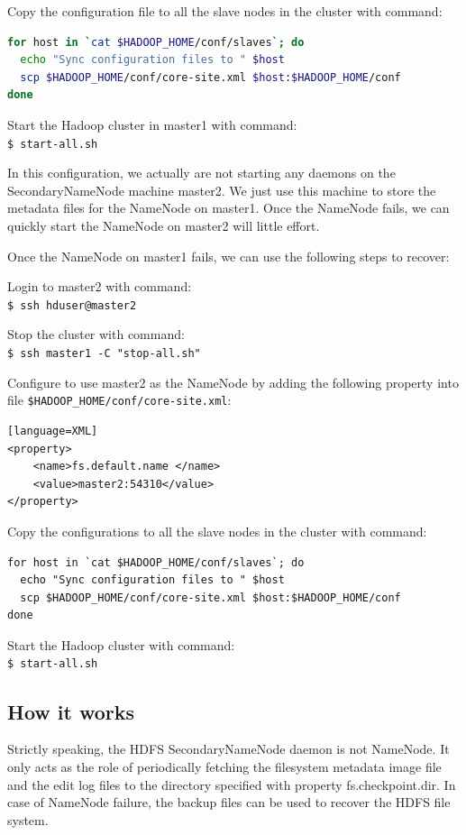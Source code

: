Copy the configuration file to all the slave nodes in the cluster with command:
\lstset{style=bashstyle}
\begin{lstlisting}[language=bash]
for host in `cat $HADOOP_HOME/conf/slaves`; do
  echo "Sync configuration files to " $host
  scp $HADOOP_HOME/conf/core-site.xml $host:$HADOOP_HOME/conf
done
\end{lstlisting}

Start the Hadoop cluster in master1 with command: \\
\verb|$ start-all.sh|

In this configuration, we actually are not starting any daemons on the SecondaryNameNode machine master2. We just use this machine to store the metadata files for the NameNode on master1. Once the NameNode fails, we can quickly start the NameNode on master2 will little effort.

Once the NameNode on master1 fails, we can use the following steps to recover:

Login to master2 with command: \\
\verb|$ ssh hduser@master2|

Stop the cluster with command: \\
\verb|$ ssh master1 -C "stop-all.sh"|

Configure to use master2 as the NameNode by adding the following property into file \verb|$HADOOP_HOME/conf/core-site.xml|:
\begin{verbatim}[language=XML]
<property>
    <name>fs.default.name </name>
    <value>master2:54310</value>
</property>
\end{verbatim}

Copy the configurations to all the slave nodes in the cluster with command:
\begin{verbatim}
for host in `cat $HADOOP_HOME/conf/slaves`; do
  echo "Sync configuration files to " $host
  scp $HADOOP_HOME/conf/core-site.xml $host:$HADOOP_HOME/conf
done
\end{verbatim}

Start the Hadoop cluster with command: \\
\verb|$ start-all.sh|

\subsection*{How it works}
Strictly speaking, the HDFS SecondaryNameNode daemon is not NameNode. It only acts as the role of periodically fetching the filesystem metadata image file and the edit log files to the directory specified with property fs.checkpoint.dir. In case of NameNode failure, the backup files can be used to recover the HDFS file system.

